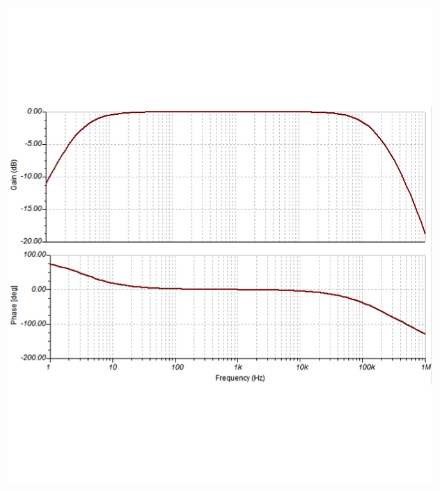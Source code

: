 \begin{frame}
\begin{figure}
\begin{minipage}{0.45\textwidth}
            \includegraphics[width=\textwidth]{fig/Bandpass_20Hz-20kHz-Freq.png}
        \end{minipage}
    \end{figure}
\end{frame}
